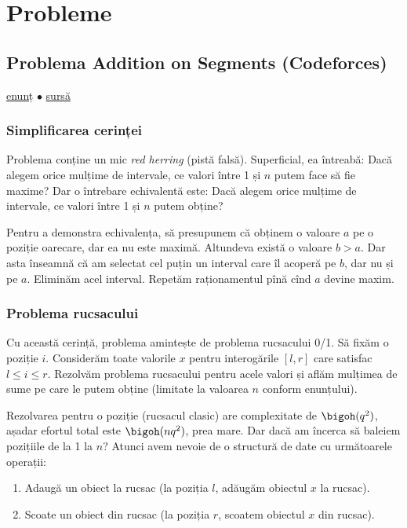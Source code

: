 \section{Probleme}

\subsection{Problema Addition on Segments (Codeforces)}
\label{problem:addition-on-segments}

\href{https://codeforces.com/contest/981/problem/E}{enunț}
$\bullet$
\hyperref[code:addition-on-segments]{sursă}

\subsubsection*{Simplificarea cerinței}

Problema conține un mic \textit{red herring} (pistă falsă). Superficial, ea întreabă: Dacă alegem orice mulțime de intervale, ce valori între 1 și $n$ putem face să fie maxime? Dar o întrebare echivalentă este: Dacă alegem orice mulțime de intervale, ce valori între 1 și $n$ putem obține?

Pentru a demonstra echivalența, să presupunem că obținem o valoare $a$ pe o poziție oarecare, dar ea nu este maximă. Altundeva există o valoare $b>a$. Dar asta înseamnă că am selectat cel puțin un interval care îl acoperă pe $b$, dar nu și pe $a$. Eliminăm acel interval. Repetăm raționamentul pînă cînd $a$ devine maxim.

\subsubsection*{Problema rucsacului}

Cu această cerință, problema amintește de problema rucsacului 0/1. Să fixăm o poziție $i$. Considerăm toate valorile $x$ pentru interogările $[l,r]$ care satisfac $l \leq i \leq r$. Rezolvăm problema rucsacului pentru acele valori și aflăm mulțimea de sume pe care le putem obține (limitate la valoarea $n$ conform enunțului).

Rezolvarea pentru o poziție (rucsacul clasic) are complexitate de $\bigoh(q^2)$, așadar efortul total este $\bigoh(nq^2)$, prea mare. Dar dacă am încerca să baleiem pozițiile de la 1 la $n$? Atunci avem nevoie de o structură de date cu următoarele operații:

\begin{enumerate}
  \item Adaugă un obiect la rucsac (la poziția $l$, adăugăm obiectul $x$ la rucsac).

  \item Scoate un obiect din rucsac (la poziția $r$, scoatem obiectul $x$ din rucsac).
\end{enumerate}


